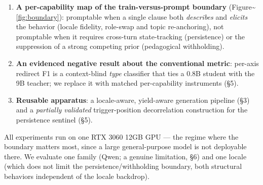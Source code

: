 \begin{enumerate}
\def\labelenumi{\arabic{enumi}.}
\tightlist
\item
  \textbf{A per-capability map of the train-versus-prompt boundary}
  (Figure\textasciitilde{}\ref{fig:boundary}): promptable when a single
  clause both \emph{describes} and \emph{elicits} the behavior (locale
  fidelity, role-swap and topic re-anchoring), not promptable when it
  requires cross-turn state-tracking (persistence) or the suppression of
  a strong competing prior (pedagogical withholding).
\item
  \textbf{An evidenced negative result about the conventional metric}:
  per-axis redirect F1 is a context-blind \emph{type} classifier that
  ties a 0.8B student with the 9B teacher; we replace it with matched
  per-capability instruments (§5).
\item
  \textbf{Reusable apparatus}: a locale-aware, yield-aware generation
  pipeline (§3) and a \emph{partially validated} trigger-position
  decorrelation construction for the persistence sentinel (§5).
\end{enumerate}

All experiments run on one RTX 3060 12GB GPU --- the regime where the
boundary matters most, since a large general-purpose model is not
deployable there. We evaluate one family (Qwen; a genuine limitation,
§6) and one locale (which does not limit the persistence/withholding
boundary, both structural behaviors independent of the locale backdrop).
